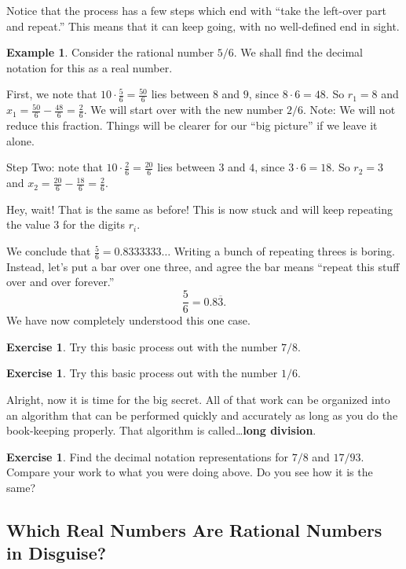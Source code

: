 \documentclass[12pt,letterpaper]{article}
\theoremstyle{definition}
\newtheorem{example}{Example}
\newtheorem{exercise}[question]{Exercise}
\begin{document}
Notice that the process has a few steps which end with ``take the left-over part and repeat.''
This means that it can keep going, with no well-defined end in sight.

\begin{example}
Consider the rational number $5/6$.
We shall find the decimal notation for this as a real number.

First, we note that $10\cdot\frac{5}{6} = \frac{50}{6}$ lies between $8$ and $9$, since $8\cdot 6 = 48$.
So $r_1 = 8$ and $x_1 = \frac{50}{6} - \frac{48}{6} = \frac{2}{6}$.
We will start over with the new number $2/6$.
Note: We will not reduce this fraction.
Things will be clearer for our ``big picture'' if we leave it alone.

Step Two: note that $10 \cdot \frac{2}{6} = \frac{20}{6}$ lies between $3$ and $4$, since $3\cdot 6 = 18$.
So $r_2 = 3$ and $x_2 = \frac{20}{6} - \frac{18}{6} = \frac{2}{6}$.

Hey, wait! 
That is the same as before!
This is now stuck and will keep repeating the value $3$ for the digits $r_i$.

We conclude that $\frac{5}{6} = 0.8333333\ldots$
Writing a bunch of repeating threes is boring.
Instead, let's put a bar over one three, and agree the bar means ``repeat this stuff over and over forever.''
\[
\frac{5}{6} = 0.8\overline{3}.
\]
We have now completely understood this one case.
\end{example}


\begin{exercise}
Try this basic process out with the number $7/8$.
\end{exercise}

\begin{exercise}
Try this basic process out with the number $1/6$.
\end{exercise}

Alright, now it is time for the big secret.
All of that work can be organized into an algorithm that can be performed quickly and accurately as long as you do the book-keeping properly.
That algorithm is called\dots \textbf{long division}.

\begin{exercise}
Find the decimal notation representations for $7/8$ and $17/93$.
Compare your work to what you were doing above.
Do you see how it is the same?
\end{exercise}

\subsection*{Which Real Numbers Are Rational Numbers in Disguise?}
\end{document}
